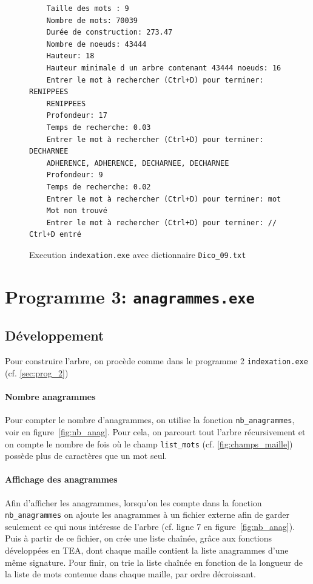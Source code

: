 \documentclass{article} %
\begin{document}
\begin{figure}[H]
  \begin{lstlisting}
    Taille des mots : 9
    Nombre de mots: 70039
    Durée de construction: 273.47 
    Nombre de noeuds: 43444
    Hauteur: 18
    Hauteur minimale d un arbre contenant 43444 noeuds: 16
    Entrer le mot à rechercher (Ctrl+D) pour terminer: RENIPPEES
    RENIPPEES
    Profondeur: 17
    Temps de recherche: 0.03
    Entrer le mot à rechercher (Ctrl+D) pour terminer: DECHARNEE
    ADHERENCE, ADHERENCE, DECHARNEE, DECHARNEE
    Profondeur: 9
    Temps de recherche: 0.02
    Entrer le mot à rechercher (Ctrl+D) pour terminer: mot
    Mot non trouvé
    Entrer le mot à rechercher (Ctrl+D) pour terminer: // Ctrl+D entré \end{lstlisting}
    \caption{Execution \texttt{indexation.exe} avec dictionnaire \texttt{Dico\_09.txt}}
    \label{fig:prog_2}
\end{figure}


\section{Programme 3: \texttt{anagrammes.exe}}
\subsection{Développement}
Pour construire l'arbre, on procède comme dans le programme 2 \texttt{indexation.exe} (cf. \ref{sec:prog_2})

\paragraph{Nombre anagrammes} Pour compter le nombre d'anagrammes, on utilise la fonction \texttt{nb\_anagrammes}, voir en figure~\ref{fig:nb_anag}. Pour cela, on parcourt tout l'arbre récursivement et on compte le nombre de fois où le champ \texttt{list\_mots} (cf. \ref{fig:champs_maille}) possède plus de caractères que un mot seul. 

\paragraph{Affichage des anagrammes} Afin d'afficher les anagrammes, lorsqu'on les compte dans la fonction \texttt{nb\_anagrammes} on ajoute les anagrammes à un fichier externe afin de garder seulement ce qui nous intéresse de l'arbre (cf. ligne 7 en figure~\ref{fig:nb_anag}). Puis à partir de ce fichier, on crée une liste chaînée, grâce aux fonctions développées en TEA, dont chaque maille contient la liste anagrammes d'une même signature. Pour finir, on trie la liste chaînée en fonction de la longueur de la liste de mots contenue dans chaque maille, par ordre décroissant. 
\end{document}

